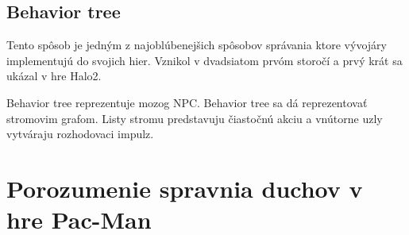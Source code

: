 \documentclass[10pt,oneside,slovak,a4paper]{article}
\begin{document}
\vspace{1cm}

\subsection{Behavior tree} \label{BT}

Tento spôsob je jedným z najoblúbenejšich spôsobov správania ktore vývojáry implementujú do svojich hier.  Vznikol v dvadsiatom prvóm storočí a prvý krát sa ukázal v hre Halo2.

 Behavior tree reprezentuje mozog NPC. 
Behavior tree sa dá reprezentovať stromovim grafom. Listy stromu predstavuju  čiastočnú akciu a vnútorne uzly vytváraju rozhodovaci impulz.~\cite{1.zdroj}


\section{Porozumenie spravnia duchov v hre Pac-Man}\label{Pac-Man}\cite{2.zdroj}



\end{document}
